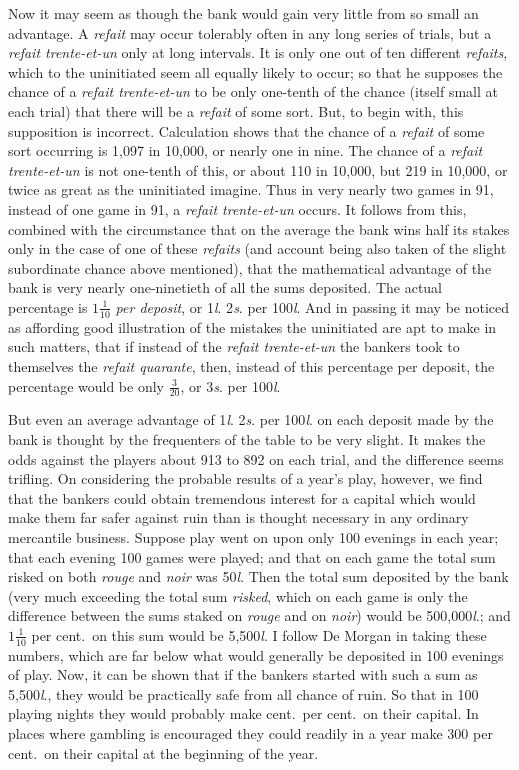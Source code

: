 \documentclass[letterpaper,12pt,oneside,openany]{memoir}
\begin{document}
Now it may seem as though the bank would gain
very little from so small an advantage. A \textit{refait} may
occur tolerably often in any long series of trials, but a
\textit{refait trente-et-un} only at long intervals. It is only one
out of ten different \textit{refaits}, which to the uninitiated
seem all equally likely to occur; so that he supposes
the chance of a \textit{refait trente-et-un} to be only one-tenth
of the chance (itself small at each trial) that there will
be a \textit{refait} of some sort. But, to begin with, this supposition
is incorrect. Calculation shows that the chance of
a \textit{refait} of some sort occurring is 1,097 in 10,000, or
nearly one in nine. The chance of a \textit{refait trente-et-un}
is not one-tenth of this, or about 110 in 10,000, but
219 in 10,000, or twice as great as the uninitiated
imagine. Thus in very nearly two games in 91,
instead of one game in 91, a \textit{refait trente-et-un} occurs.
It follows from this, combined with the circumstance
that on the average the bank wins half its stakes only
in the case of one of these \textit{refaits} (and account being
also taken of the slight subordinate chance above mentioned),
that the mathematical advantage of the bank is
very nearly one-ninetieth of all the sums deposited. The
actual percentage is $1\frac{1}{10}$ \textit{per deposit},
or 1\textit{l}. 2\textit{s}. per 100\textit{l}.
And in passing it may be noticed as affording good
illustration of the mistakes the uninitiated are apt to
make in such matters, that if instead of the \textit{refait trente-et-un}
the bankers took to themselves the \textit{refait quarante},
then, instead of this percentage per deposit, the percentage
would be only $\frac{3}{20}$, or 3\textit{s}. per 100\textit{l}.

But even an average advantage of 1\textit{l}. 2\textit{s}. per 100\textit{l}. on
each deposit made by the bank is thought by the frequenters
of the table to be very slight. It makes the odds
against the players about 913 to 892 on each trial, and the
difference seems trifling. On considering the probable
results of a year's play, however, we find that the
bankers could obtain tremendous interest for a capital
which would make them far safer against ruin than is
thought necessary in any ordinary mercantile business.
Suppose play went on upon only 100 evenings in each
year; that each evening 100 games were played; and
that on each game the total sum risked on both \textit{rouge}
and \textit{noir} was 50\textit{l}. Then the total sum deposited by
the bank (very much exceeding the total sum \textit{risked},
which on each game is only the difference between the
sums staked on \emph{rouge} and on \emph{noir}) would be 500,000\textit{l}.;
and  $1\frac{1}{10}$ per cent.\ on this sum would be 5,500\textit{l}. I
follow De Morgan in taking these numbers, which are
far below what would generally be deposited in 100
evenings of play. Now, it can be shown that if the
bankers started with such a sum as 5,500\textit{l}., they would
be practically safe from all chance of ruin. So that in
100 playing nights they would probably make cent.\ per cent.\ on
their capital. In places where gambling
is encouraged they could readily in a year make 300
per cent.\ on their capital at the beginning of the year.
\end{document}

